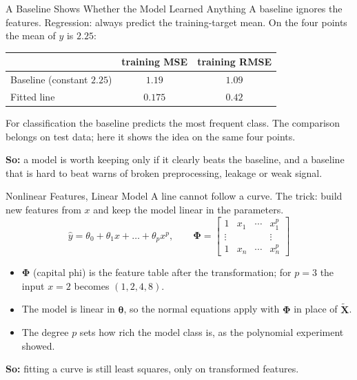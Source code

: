 \documentclass{ntuabeamer}
\newcommand{\takeaway}[1]{\par\vspace{0.3cm}\begingroup\raggedright\noindent
  {\color{courseblue}\textbf{So:}} #1\par\endgroup}
\begin{document}
\begin{frame}{A Baseline Shows Whether the Model Learned Anything}
  A baseline ignores the features. Regression: always predict the training-target mean.
  On the four points the mean of $y$ is $2.25$:
  \begin{center}
    \begin{tabular}{lcc}
      \toprule
      & training MSE & training RMSE \\
      \midrule
      Baseline (constant $2.25$) & $1.19$ & $1.09$ \\
      Fitted line & $0.175$ & $0.42$ \\
      \bottomrule
    \end{tabular}
  \end{center}
  For classification the baseline predicts the most frequent class.
  The comparison belongs on test data; here it shows the idea on the same four points.
  \takeaway{a model is worth keeping only if it clearly beats the baseline, and a baseline that is hard to beat warns of broken preprocessing, leakage or weak signal.}
\end{frame}

\begin{frame}{Nonlinear Features, Linear Model}
  A line cannot follow a curve. The trick: build new features from $x$ and keep the model linear in the parameters.
  \[
    \hat y=\theta_0+\theta_1x+\dots+\theta_px^p,
    \qquad
    \boldsymbol\Phi=\begin{bmatrix}1&x_1&\cdots&x_1^{p}\\[-1mm]\vdots&&&\vdots\\1&x_n&\cdots&x_n^{p}\end{bmatrix}
  \]
  \begin{itemize}
    \item $\boldsymbol\Phi$ (capital phi) is the feature table after the transformation; for $p=3$ the input $x=2$ becomes $(1,2,4,8)$.
    \item The model is linear in $\boldsymbol\theta$, so the normal equations apply with $\boldsymbol\Phi$ in place of $\widetilde{\mathbf X}$.
    \item The degree $p$ sets how rich the model class is, as the polynomial experiment showed.
  \end{itemize}
  \takeaway{fitting a curve is still least squares, only on transformed features.}
\end{frame}

\end{document}
